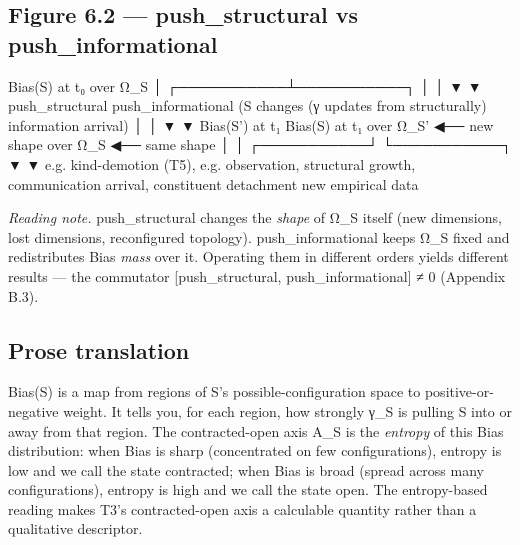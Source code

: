 \documentclass[11pt, openany]{book}
\begin{document}
\subsection{Figure 6.2 --- push\_\allowbreak{}structural vs push\_\allowbreak{}informational}

\begin{Code}
                       Bias(S) at t₀
                           over Ω_S
                              │
                  ┌───────────┴───────────┐
                  │                       │
                  ▼                       ▼
         push_structural          push_informational
         (S changes               (γ updates from
          structurally)            information arrival)
                  │                       │
                  ▼                       ▼
         Bias(S') at t₁            Bias(S) at t₁
         over Ω_S'  ◀── new shape  over Ω_S  ◀── same shape
                  │                       │
      ┌───────────┘                       └───────────┐
      ▼                                               ▼
  e.g. kind-demotion (T5),               e.g. observation,
  structural growth,                     communication arrival,
  constituent detachment                 new empirical data
\end{Code}

\textit{Reading note.} push\_\allowbreak{}structural changes the \textit{shape} of Ω\_\allowbreak{}S itself (new dimensions, lost dimensions, reconfigured topology). push\_\allowbreak{}informational keeps Ω\_\allowbreak{}S fixed and redistributes Bias \textit{mass} over it. Operating them in different orders yields different results --- the commutator [push\_\allowbreak{}structural, push\_\allowbreak{}informational] ≠ 0 (Appendix B.3).

\subsection{Prose translation}

Bias(S) is a map from regions of S's possible-configuration space to positive-or-negative weight. It tells you, for each region, how strongly γ\_\allowbreak{}S is pulling S into or away from that region. The contracted-open axis A\_\allowbreak{}S is the \textit{entropy} of this Bias distribution: when Bias is sharp (concentrated on few configurations), entropy is low and we call the state contracted; when Bias is broad (spread across many configurations), entropy is high and we call the state open. The entropy-based reading makes T3's contracted-open axis a calculable quantity rather than a qualitative descriptor.
\end{document}
